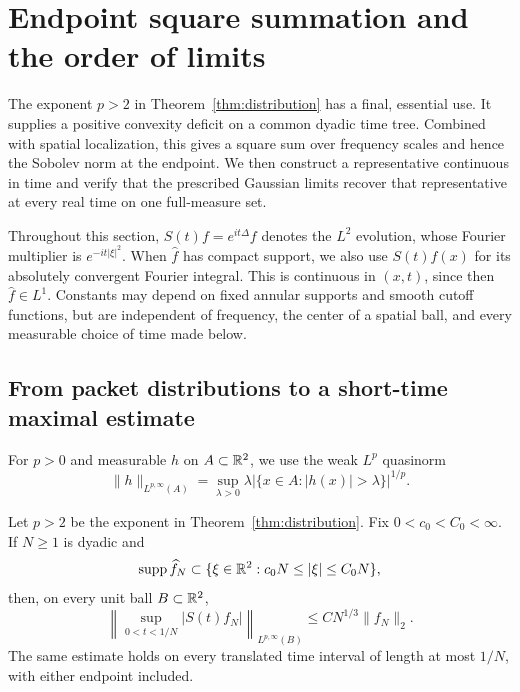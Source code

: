 \section{Endpoint square summation and the order of limits}
\label{sec:endpoint}

The exponent $p>2$ in Theorem~\ref{thm:distribution} has a final, essential
use. It supplies a positive convexity deficit on a common dyadic time
tree. Combined with spatial localization, this gives a square sum over
frequency scales and hence the Sobolev norm at the endpoint.  We then construct a representative continuous in time
and verify that the prescribed Gaussian limits recover that representative
at every real time on one full-measure set.

Throughout this section, $S(t)f=e^{it\Delta}f$ denotes the $L^2$ evolution,
whose Fourier multiplier is $e^{-it|\xi|^2}$.  When $\widehat f$ has compact
support, we also use $S(t)f(x)$ for its absolutely convergent Fourier
integral.  This is continuous in $(x,t)$, since then
$\widehat f\in L^1$.  Constants may depend on fixed annular supports and
smooth cutoff functions, but are independent of frequency, the center of
a spatial ball, and every measurable choice of time made below.

\subsection{From packet distributions to a short-time maximal estimate}

For $p>0$ and measurable $h$ on $A\subset\mathbb R^2$, we use the weak $L^p$
quasinorm
\[
 \|h\|_{L^{p,\infty}(A)}
   =\sup_{\lambda>0}\lambda
      |\{x\in A:|h(x)|>\lambda\}|^{1/p}.
\]

\begin{proposition}
\label{prop:shortmax}
Let $p>2$ be the exponent in Theorem~\ref{thm:distribution}.  Fix
$0<c_0<C_0<\infty$.  If $N\ge1$ is dyadic and
\[
 \operatorname{supp}\widehat f_N\subset
 \{\xi\in\mathbb R^2:c_0N\le |\xi|\le C_0N\},
\]
then, on every unit ball $B\subset\mathbb R^2$,
\begin{equation}
 \left\|\sup_{0<t<1/N}|S(t)f_N|\right\|_{L^{p,\infty}(B)}
 \le C N^{1/3}\|f_N\|_2.
 \label{eq:src24}
\end{equation}
The same estimate holds on every translated time interval of length at
most $1/N$, with either endpoint included.
\end{proposition}

